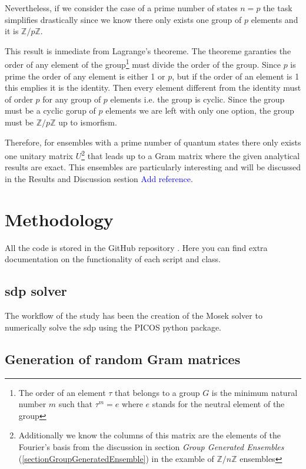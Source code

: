 \documentclass[12pt,letterpaper]{article}
\begin{document}
\begin{multicols}{2}
Nevertheless, if we consider the case of a prime number of states $n=p$ the task simplifies drastically since we know there only exists one group of $p$ elements and it is $\mathbb{Z}/p\mathbb{Z}$. 

This result is inmediate from Lagrange's theoreme. The theoreme garanties the order of any element of the group\footnote{The order of an element $\tau$ that belongs to a group $G$ is the minimum natural number $m$ such that $\tau^m=e$ where $e$ stands for the neutral element of the group} must divide the order of the group. Since $p$ is prime the order of any element is either 1 or $p$, but if the order of an element is 1 this emplies it is the identity. Then every element different from the identity must of order $p$ for any group of $p$ elements i.e. the group is cyclic. Since the group must be a cyclic gorup of $p$ elements we are left with only one option, the group must be $\mathbb{Z}/p\mathbb{Z}$ up to ismorfism.

Therefore, for ensembles with a prime number of quantum states there only exists one unitary matrix $U$\footnote{Additionally we know the columns of this matrix are the elements of the Fourier's basis from the discussion in section \emph{Group Generated Ensembles} (\ref{sectionGroupGeneratedEnsemble}) in the examble of $\mathbb{Z}/n\mathbb{Z}$ ensembles} that leads up to a Gram matrix where the given analytical results are exact. This ensembles are particularly interesting and will be discussed in the Results and Discussion sestion \textcolor{blue}{Add reference}.

\section{Methodology}
All the code is stored in the GitHub repository \cite{GitHub}. Here you can find extra documentation on the functionality of each script and class.

\subsection{\gls{sdp} solver}

The workflow of the study has been the creation of the Mosek solver \cite{mosek_sdp} to numerically solve the \gls{sdp} using the PICOS python package\cite{PICOS}.

\subsection{Generation of random Gram matrices}


\end{multicols}
\end{document}
